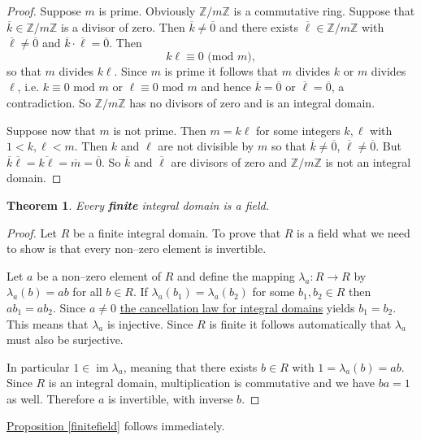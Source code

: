 \documentclass[11pt]{amsbook}
\DeclareMathOperator{\im}{\mathrm{im}}
\newtheorem{theorem}{Theorem}[section]
\theoremstyle{definition}
\begin{document}
\begin{proof} Suppose $m$ is prime. Obviously $\mathbb{Z}/m\mathbb{Z}$ is a commutative ring. Suppose that $\overline{k}\in\mathbb{Z}/m\mathbb{Z}$ is a divisor of zero. Then $\overline{k}\neq \overline{0}$ and there exists $\overline{\ell} \in \mathbb{Z}/m\mathbb{Z}$ with $\overline{\ell} \neq \overline{0}$ and $\overline{k}\cdot \overline{\ell} = \overline{0}$. Then $$k \ell \equiv 0 \text{ (mod $m$)},$$ so that $m$ divides $k\ell $. Since $m$ is prime it follows that $m$ divides $k$ or $m$ divides $\ell$, i.e. $k\equiv 0 \text{ mod $m$}$ or $\ell\equiv 0 \text{ mod $m$}$ and hence $\overline{k} = \overline{0}$ or $\overline{\ell} = \overline{0}$, a contradiction. So $\mathbb{Z}/m\mathbb{Z}$ has no divisors of zero and is an integral domain.

Suppose now that $m$ is not prime. Then $m=k\ell$ for some integers
$k,\ell$ with $1<k,\ell < m$. Then $k$ and $\ell$ are not divisible by $m$
so that $\overline{k} \neq \overline{0}$, $\overline{\ell} \neq \overline{0}$. But $\overline{k}\overline{\ell} = \overline{k\ell} =\overline{m} = \overline{0}$. So $\overline{k}$ and $\overline{\ell}$ are divisors of zero and $\mathbb{Z}/m\mathbb{Z}$ is not
an integral domain.
\end{proof}

\begin{theorem}\label{finid}
Every \textbf{finite} integral domain is a field.
\end{theorem}

\begin{proof} Let $R$ be a finite integral domain. To prove that $R$ is a field what we need to show is that every non--zero element is invertible.

Let $a$ be a non--zero element of $R$ and define the mapping
$\lambda_a : R\to R$ by $\lambda_a (b) = ab$
for all $b\in R$. If $\lambda_a(b_1) = \lambda_a(b_2)$ for some
$b_1,b_2 \in R$ then $ab_1 = ab_2$. Since $a\neq 0$ \hyperref[cancid]{the cancellation law for integral domains} yields $b_1= b_2$. This means that $\lambda_a$ is injective. Since $R$ is finite it follows automatically that $\lambda_a$ must also be surjective.

In particular $1\in \im \lambda_a$, meaning that there exists $b\in R$ with $1 = \lambda_a(b) = ab$. Since $R$ is an integral domain, multiplication is
commutative and we have $ba=1$ as well.
Therefore $a$ is invertible, with inverse $b$.
\end{proof}

\hyperref[finitefield]{Proposition \ref{finitefield}} follows immediately.
\end{document}
